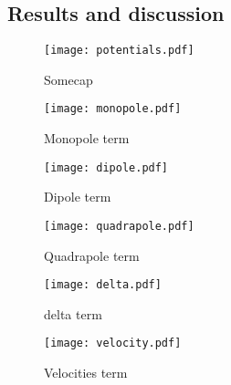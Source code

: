 \subsection{Results and discussion}\label{sec:m3:results}


    \begin{figure}
        \texttt{[image: potentials.pdf]}
        \caption{Somecap}
        \label{fig:m3:potentials}
    \end{figure}

    \begin{figure}
        \texttt{[image: monopole.pdf]}
        \caption{Monopole term}
        \label{fig:m3:monopole}
    \end{figure}

    \begin{figure}
        \texttt{[image: dipole.pdf]}
        \caption{Dipole term}
        \label{fig:m3:dipole}
    \end{figure}

    \begin{figure}
        \texttt{[image: quadrapole.pdf]}
        \caption{Quadrapole term}
        \label{fig:m3:quadrapole}
    \end{figure}

    \begin{figure}
        \texttt{[image: delta.pdf]}
        \caption{delta term}
        \label{fig:m3:delta}
    \end{figure}

    \begin{figure}
        \texttt{[image: velocity.pdf]}
        \caption{Velocities term}
        \label{fig:m3:velocity}
    \end{figure}